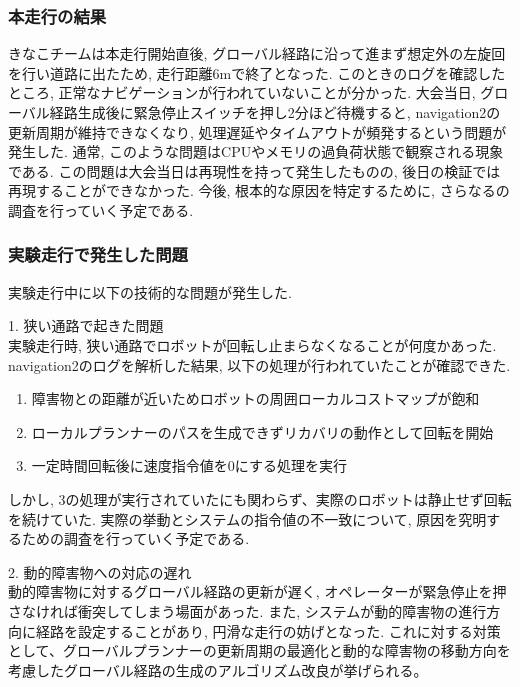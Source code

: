 \subsubsection{本走行の結果}
きなこチームは本走行開始直後, グローバル経路に沿って進まず想定外の左旋回を行い道路に出たため, 走行距離6mで終了となった. 
このときのログを確認したところ, 正常なナビゲーションが行われていないことが分かった. 
大会当日, グローバル経路生成後に緊急停止スイッチを押し2分ほど待機すると, navigation2の更新周期が維持できなくなり, 処理遅延やタイムアウトが頻発するという問題が発生した. 
通常, このような問題はCPUやメモリの過負荷状態で観察される現象である. 
この問題は大会当日は再現性を持って発生したものの, 後日の検証では再現することができなかった. 
今後, 根本的な原因を特定するために, さらなるの調査を行っていく予定である. 

\subsubsection{実験走行で発生した問題}
実験走行中に以下の技術的な問題が発生した. 

1. 狭い通路で起きた問題\\
実験走行時, 狭い通路でロボットが回転し止まらなくなることが何度かあった. 
navigation2のログを解析した結果, 以下の処理が行われていたことが確認できた. 

\begin{enumerate}
  \item 障害物との距離が近いためロボットの周囲ローカルコストマップが飽和
  \item ローカルプランナーのパスを生成できずリカバリの動作として回転を開始
  \item  一定時間回転後に速度指令値を0にする処理を実行
\end{enumerate}

しかし, 3の処理が実行されていたにも関わらず、実際のロボットは静止せず回転を続けていた. 
実際の挙動とシステムの指令値の不一致について, 原因を究明するための調査を行っていく予定である. 

2. 動的障害物への対応の遅れ\\
動的障害物に対するグローバル経路の更新が遅く, オペレーターが緊急停止を押さなければ衝突してしまう場面があった. 
また, システムが動的障害物の進行方向に経路を設定することがあり, 円滑な走行の妨げとなった. 
これに対する対策として、グローバルプランナーの更新周期の最適化と動的な障害物の移動方向を考慮したグローバル経路の生成のアルゴリズム改良が挙げられる。